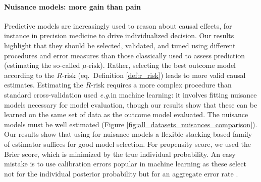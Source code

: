 \documentclass[10pt,twocolumn]{article}
\newcommand{\eg}{\emph{e.g.}}
\begin{document}
\paragraph{Nuisance models: more gain than pain}
%
Predictive models are increasingly used to reason about causal effects, for
instance in precision medicine to drive individualized decision. Our results
highlight that they should be selected, validated, and tuned using different
procedures and error measures than those classically used to assess prediction
(estimating the so-called $\mu\text{-risk}$). Rather, selecting the best outcome
model according to the $R\text{-risk}$ (eq.\, Definition \ref{def:r_risk}) leads
to more valid causal estimates. Estimating the $R\text{-risk}$ requires a more
complex procedure than standard cross-validation used \eg in machine
learning: it involves fitting nuisance models necessary for model evaluation,
though our results show that these can be learned on the same set of data as the
outcome model evaluated. The nuisance models must be well estimated (Figure
\ref{fig:all_datasets_nuisances_comparison}). Our results show that using for
nuisance models a flexible stacking-based family of estimator suffices for good
model selection. For propensity score, we used the Brier score,
which is minimized by the true individual probability. An easy mistake is to
use calibration errors popular in machine learning
\cite{platt_probabilistic_1999,zadrozny_obtaining_2001,niculescu-mizil_predicting_2005,minderer_revisiting_2021}
as these select not for the individual posterior probability but for an
aggregate error rate \cite{perez2022beyond}.


%
\end{document}
